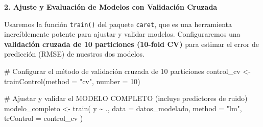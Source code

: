 \documentclass[
  letterpaper,
  DIV=11,
  numbers=noendperiod]{scrreprt}
\newenvironment{Shaded}{\begin{snugshade}}{\end{snugshade}}
\newcommand{\AttributeTok}[1]{\textcolor[rgb]{0.40,0.45,0.13}{#1}}
\newcommand{\CommentTok}[1]{\textcolor[rgb]{0.37,0.37,0.37}{#1}}
\newcommand{\ConstantTok}[1]{\textcolor[rgb]{0.56,0.35,0.01}{#1}}
\newcommand{\DecValTok}[1]{\textcolor[rgb]{0.68,0.00,0.00}{#1}}
\newcommand{\FloatTok}[1]{\textcolor[rgb]{0.68,0.00,0.00}{#1}}
\newcommand{\FunctionTok}[1]{\textcolor[rgb]{0.28,0.35,0.67}{#1}}
\newcommand{\NormalTok}[1]{\textcolor[rgb]{0.00,0.23,0.31}{#1}}
\newcommand{\OtherTok}[1]{\textcolor[rgb]{0.00,0.23,0.31}{#1}}
\newcommand{\SpecialCharTok}[1]{\textcolor[rgb]{0.37,0.37,0.37}{#1}}
\newcommand{\StringTok}[1]{\textcolor[rgb]{0.13,0.47,0.30}{#1}}
\begin{document}
\begin{tcolorbox}
\begin{Shaded}
\end{Shaded}

\textbf{2. Ajuste y Evaluación de Modelos con Validación Cruzada}

Usaremos la función \texttt{train()} del paquete \texttt{caret}, que es
una herramienta increíblemente potente para ajustar y validar modelos.
Configuraremos una \textbf{validación cruzada de 10 particiones (10-fold
CV)} para estimar el error de predicción (RMSE) de nuestros dos modelos.

\begin{Shaded}
\begin{Highlighting}[]
\CommentTok{\# Configurar el método de validación cruzada de 10 particiones}
\NormalTok{control\_cv }\OtherTok{\textless{}{-}} \FunctionTok{trainControl}\NormalTok{(}\AttributeTok{method =} \StringTok{"cv"}\NormalTok{, }\AttributeTok{number =} \DecValTok{10}\NormalTok{)}

\CommentTok{\# Ajustar y validar el MODELO COMPLETO (incluye predictores de ruido)}
\NormalTok{modelo\_completo }\OtherTok{\textless{}{-}} \FunctionTok{train}\NormalTok{(}
\NormalTok{  y }\SpecialCharTok{\textasciitilde{}}\NormalTok{ ., }
  \AttributeTok{data =}\NormalTok{ datos\_modelado, }
  \AttributeTok{method =} \StringTok{"lm"}\NormalTok{,}
  \AttributeTok{trControl =}\NormalTok{ control\_cv}
\NormalTok{)}


\end{Highlighting}
\end{Shaded}
\end{tcolorbox}
\end{document}
